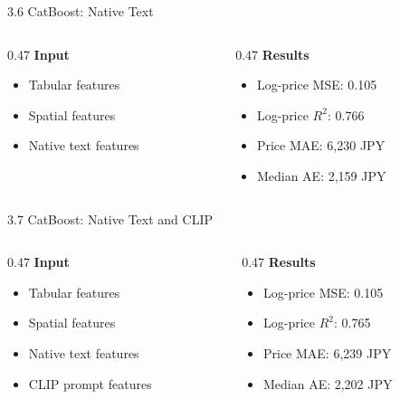\documentclass[aspectratio=169,11pt]{beamer}
\begin{document}
\begin{frame}{3.6 CatBoost: Native Text}
  \begin{columns}[T,onlytextwidth]
    \begin{column}{0.47\textwidth}
      \textbf{Input}
      \begin{itemize}
        \item Tabular features
        \item Spatial features
        \item Native text features
      \end{itemize}
    \end{column}
    \begin{column}{0.47\textwidth}
      \textbf{Results}
      \begin{itemize}
        \item Log-price MSE: 0.105
        \item Log-price $R^2$: 0.766
        \item Price MAE: 6,230 JPY
        \item Median AE: 2,159 JPY
      \end{itemize}
    \end{column}
  \end{columns}
\end{frame}

\begin{frame}{3.7 CatBoost: Native Text and CLIP}
  \begin{columns}[T,onlytextwidth]
    \begin{column}{0.47\textwidth}
      \textbf{Input}
      \begin{itemize}
        \item Tabular features
        \item Spatial features
        \item Native text features
        \item CLIP prompt features
      \end{itemize}
    \end{column}
    \begin{column}{0.47\textwidth}
      \textbf{Results}
      \begin{itemize}
        \item Log-price MSE: 0.105
        \item Log-price $R^2$: 0.765
        \item Price MAE: 6,239 JPY
        \item Median AE: 2,202 JPY
      \end{itemize}
    \end{column}
  \end{columns}
\end{frame}
\end{document}
